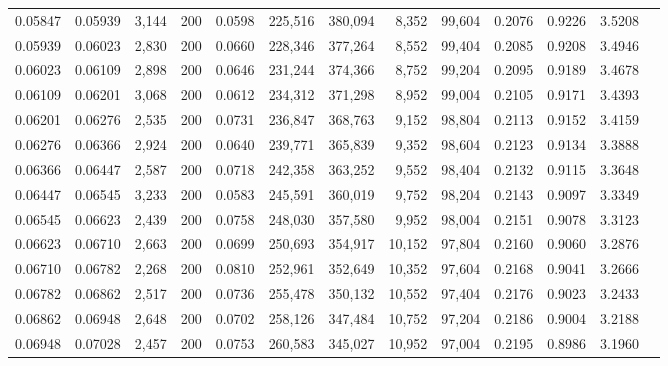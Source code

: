 \begin{tabular}{rrrrrrrrrrrrr}
0.05847 & 0.05939 &  3,144 & 200 &                                     0.0598 & 225,516 & 380,094 &   8,352 &  99,604 & 0.2076 & 0.9226 & 3.5208 \\
0.05939 & 0.06023 &  2,830 & 200 &                                     0.0660 & 228,346 & 377,264 &   8,552 &  99,404 & 0.2085 & 0.9208 & 3.4946 \\
0.06023 & 0.06109 &  2,898 & 200 &                                     0.0646 & 231,244 & 374,366 &   8,752 &  99,204 & 0.2095 & 0.9189 & 3.4678 \\
0.06109 & 0.06201 &  3,068 & 200 &                                     0.0612 & 234,312 & 371,298 &   8,952 &  99,004 & 0.2105 & 0.9171 & 3.4393 \\
0.06201 & 0.06276 &  2,535 & 200 &                                     0.0731 & 236,847 & 368,763 &   9,152 &  98,804 & 0.2113 & 0.9152 & 3.4159 \\
0.06276 & 0.06366 &  2,924 & 200 &                                     0.0640 & 239,771 & 365,839 &   9,352 &  98,604 & 0.2123 & 0.9134 & 3.3888 \\
0.06366 & 0.06447 &  2,587 & 200 &                                     0.0718 & 242,358 & 363,252 &   9,552 &  98,404 & 0.2132 & 0.9115 & 3.3648 \\
0.06447 & 0.06545 &  3,233 & 200 &                                     0.0583 & 245,591 & 360,019 &   9,752 &  98,204 & 0.2143 & 0.9097 & 3.3349 \\
0.06545 & 0.06623 &  2,439 & 200 &                                     0.0758 & 248,030 & 357,580 &   9,952 &  98,004 & 0.2151 & 0.9078 & 3.3123 \\
0.06623 & 0.06710 &  2,663 & 200 &                                     0.0699 & 250,693 & 354,917 &  10,152 &  97,804 & 0.2160 & 0.9060 & 3.2876 \\
0.06710 & 0.06782 &  2,268 & 200 &                                     0.0810 & 252,961 & 352,649 &  10,352 &  97,604 & 0.2168 & 0.9041 & 3.2666 \\
0.06782 & 0.06862 &  2,517 & 200 &                                     0.0736 & 255,478 & 350,132 &  10,552 &  97,404 & 0.2176 & 0.9023 & 3.2433 \\
0.06862 & 0.06948 &  2,648 & 200 &                                     0.0702 & 258,126 & 347,484 &  10,752 &  97,204 & 0.2186 & 0.9004 & 3.2188 \\
0.06948 & 0.07028 &  2,457 & 200 &                                     0.0753 & 260,583 & 345,027 &  10,952 &  97,004 & 0.2195 & 0.8986 & 3.1960 \\

\end{tabular}
